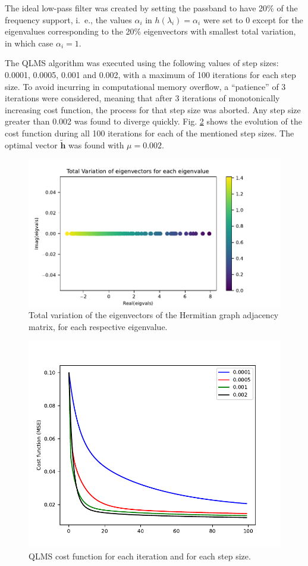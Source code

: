 The ideal low-pass filter was created by setting the passband to have 20\% of the frequency support, i.~e., the values $\alpha_i$ in $h(\lambda_i) = \alpha_i$ were set to 0 except for the eigenvalues corresponding to the 20\% eigenvectors with smallest total variation, in which case $\alpha_i = 1$.

The QLMS algorithm was executed using the following values of step sizes: 0.0001, 0.0005, 0.001 and 0.002, with a maximum of 100 iterations for each step size. To avoid incurring in computational memory overflow, a ``patience'' of 3 iterations were considered, meaning that after 3 iterations of monotonically increasing cost function, the process for that step size was aborted. Any step size greater than 0.002 was found to diverge quickly. Fig. \ref{fig:uk_qlms_iterations} shows the evolution of the cost function during all 100 iterations for each of the mentioned step sizes. The optimal vector $\mathbf{\widetilde{h}}$ was found with $\mu = 0.002$.

\begin{figure}
    \centering
    \includegraphics[width=0.65\linewidth]{Figures/uk_example/uk_total_variation_hermitian.pdf}
    \caption{Total variation of the eigenvectors of the Hermitian graph adjacency matrix, for each respective eigenvalue.}
    \label{fig:uk_total_variation_hermitian}
\end{figure}

\begin{figure}
    \centering
    \includegraphics[width=0.65\linewidth]{Figures/uk_example/uk_qlms_iterations.pdf}
    \caption{QLMS cost function for each iteration and for each step size.}
    \label{fig:uk_qlms_iterations}
\end{figure}

